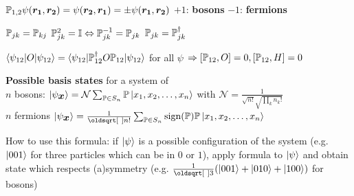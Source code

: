 \begin{squishlist}
    \item $\P_{1,2} \psi(\vec{r_1}, \vec{r_2}) = \psi(\vec{r_2}, \vec{r_1}) = \pm \psi(\vec{r_1}, \vec{r_2})$ \quad $+1$: \textbf{bosons} \quad $-1$: \textbf{fermions}
    \item $\P_{jk} = \P_{kj}$ \squishsep $\P_{jk}^2 = \id \Leftrightarrow \P_{jk}^{-1}=\P_{jk}$ \squishsep $\P_{jk} = \P_{jk}^{\dagger}$
    \item $\braket{\psi_{12}|O|\psi_{12}} = \braket{\psi_{12}|\P_{12}^{\dagger}O\P_{12}|\psi_{12}}$ for all $\psi$ $\Rightarrow [\P_{12},O] = 0, [\P_{12},H] = 0$
    \item \textbf{Possible basis states} for a system of \\ $n$ bosons: $\ket{\psi_{\vec{x}}} = \mathcal{N} \sum_{\P \in S_n} \P\ket{x_1,x_2, \ldots, x_n}$ with $\mathcal{N} = \frac{1}{\sqrt{n!}\sqrt{\prod_k n_k !}}$ \\
    $n$ fermions $\ket{\psi_{\vec{x}}} = \frac{1}{\sqrt{n!}} \sum_{\P \in S_n} \text{sign}(\P) \P \ket{x_1, x_2, \ldots, x_n}$
    \item How to use this formula: if $\kpsi$ is a possible configuration of the system (e.g. $\ket{001}$ for three particles which can be in $0$ or $1$), apply formula to $\kpsi$ and obtain state which respects (a)symmetry (e.g. $\frac{1}{\sqrt{3}}(\ket{001} + \ket{010} + \ket{100})$ for bosons)
\end{squishlist}

